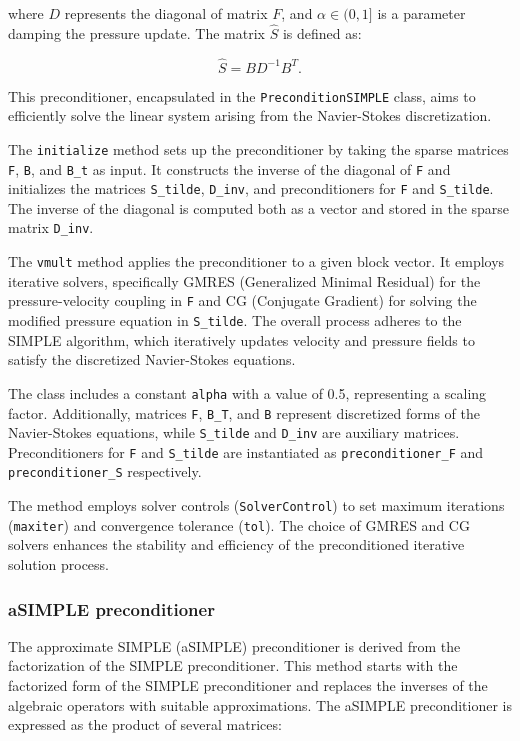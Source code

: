 \documentclass{article}
\begin{document}
where \(D\) represents the diagonal of matrix \(F\), and \(\alpha \in (0, 1]\) is a parameter damping the pressure update. The matrix \(\hat{S}\) is defined as:

\begin{equation}
    \hat{S} = B D^{-1} B^T.
\end{equation}

This preconditioner, encapsulated in the \texttt{PreconditionSIMPLE} class, aims to efficiently solve the linear system arising from the Navier-Stokes discretization.

The \texttt{initialize} method sets up the preconditioner by taking the sparse matrices \texttt{F}, \texttt{B}, and \texttt{B\_t} as input. It constructs the inverse of the diagonal of \texttt{F} and initializes the matrices \texttt{S\_tilde}, \texttt{D\_inv}, and preconditioners for \texttt{F} and \texttt{S\_tilde}. The inverse of the diagonal is computed both as a vector and stored in the sparse matrix \texttt{D\_inv}.

The \texttt{vmult} method applies the preconditioner to a given block vector. It employs iterative solvers, specifically GMRES (Generalized Minimal Residual) for the pressure-velocity coupling in \texttt{F} and CG (Conjugate Gradient) for solving the modified pressure equation in \texttt{S\_tilde}. The overall process adheres to the SIMPLE algorithm, which iteratively updates velocity and pressure fields to satisfy the discretized Navier-Stokes equations.

The class includes a constant \texttt{alpha} with a value of 0.5, representing a scaling factor. Additionally, matrices \texttt{F}, \texttt{B\_T}, and \texttt{B} represent discretized forms of the Navier-Stokes equations, while \texttt{S\_tilde} and \texttt{D\_inv} are auxiliary matrices. Preconditioners for \texttt{F} and \texttt{S\_tilde} are instantiated as \texttt{preconditioner\_F} and \texttt{preconditioner\_S} respectively.

The method employs solver controls (\texttt{SolverControl}) to set maximum iterations (\texttt{maxiter}) and convergence tolerance (\texttt{tol}). The choice of GMRES and CG solvers enhances the stability and efficiency of the preconditioned iterative solution process.



\subsubsection{aSIMPLE preconditioner}
The approximate SIMPLE (aSIMPLE) preconditioner is derived from the factorization of the SIMPLE preconditioner. This method starts with the factorized form of the SIMPLE preconditioner and replaces the inverses of the algebraic operators with suitable approximations.
The aSIMPLE preconditioner is expressed as the product of several matrices:
\end{document}
